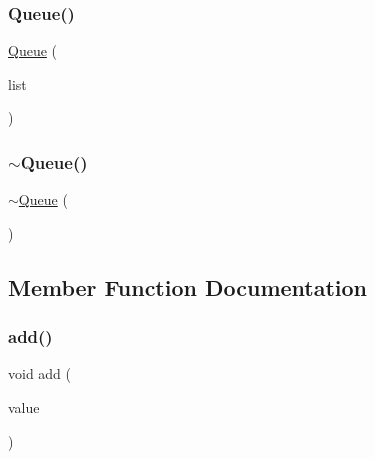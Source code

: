 \mbox{\label{classQueue_a0ad6572f7c8e567d440ef6735d2f4a32}} 
\subsubsection{\texorpdfstring{Queue()}{Queue()}\hspace{0.1cm}{\footnotesize\ttfamily [2/2]}}
{\footnotesize\ttfamily \mbox{\hyperlink{classQueue}{Queue}} (\begin{DoxyParamCaption}\item[{std\+::initializer\+\_\+list$<$ Value\+Type $>$}]{list }\end{DoxyParamCaption})}

\mbox{\label{classQueue_a240bdcfcc136e53aeaac3aa454cc26bf}} 
\subsubsection{\texorpdfstring{$\sim$\+Queue()}{~Queue()}}
{\footnotesize\ttfamily $\sim$\mbox{\hyperlink{classQueue}{Queue}} (\begin{DoxyParamCaption}{ }\end{DoxyParamCaption})\hspace{0.3cm}{\ttfamily [virtual]}}



\subsection{Member Function Documentation}
\mbox{\label{classQueue_ab901606bf3a8019c986f0cf9a9f298dc}} 
\subsubsection{\texorpdfstring{add()}{add()}}
{\footnotesize\ttfamily void add (\begin{DoxyParamCaption}\item[{const Value\+Type \&}]{value }\end{DoxyParamCaption})}

\mbox{\label{classQueue_adc761c91bdacd01bed5c96e25fd9486a}} 
